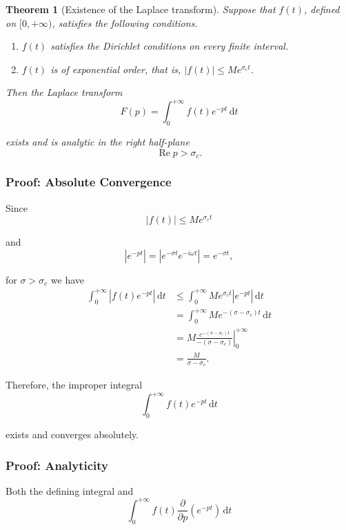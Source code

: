 \documentclass[11pt,a4paper]{article}
\theoremstyle{definition}
\theoremstyle{plain}
\newtheorem{theorem}{Theorem}
\begin{document}
\begin{theorem}[Existence of the Laplace transform]

Suppose that \(f(t)\), defined on \([0,+\infty)\), satisfies the
following conditions.

\begin{enumerate}
\def\labelenumi{\arabic{enumi}.}
\item
  \(f(t)\) satisfies the Dirichlet conditions on every finite interval.

\item
  \(f(t)\) is of exponential order, that is,
  \(|f(t)|\le Me^{\sigma_ct}\).

\end{enumerate}

Then the Laplace transform
\[
F(p)=\int_0^{+\infty}f(t)e^{-pt}\,\mathrm dt
\]

exists and is analytic in the right half-plane
\[
\operatorname{Re}p>\sigma_c.
\]
\end{theorem}

\subsubsection*{Proof: Absolute Convergence}

Since
\[
|f(t)|\le Me^{\sigma_ct}
\]

and
\[
|e^{-pt}|
=|e^{-\sigma t}e^{-i\omega t}|
=e^{-\sigma t},
\]

for \(\sigma>\sigma_c\) we have
\[
\begin{aligned}
\int_0^{+\infty}|f(t)e^{-pt}|\,\mathrm dt
&\le\int_0^{+\infty}Me^{\sigma_ct}|e^{-pt}|\,\mathrm dt\\
&=\int_0^{+\infty}Me^{-(\sigma-\sigma_c)t}\,\mathrm dt\\
&=\left.
M\frac{e^{-(\sigma-\sigma_c)t}}{-(\sigma-\sigma_c)}
\right|_0^{+\infty}\\
&=\frac{M}{\sigma-\sigma_c}.
\end{aligned}
\]

Therefore, the improper integral
\[
\int_0^{+\infty}f(t)e^{-pt}\,\mathrm dt
\]

exists and converges absolutely.

\subsubsection*{Proof: Analyticity}

Both the defining integral and
\[
\int_0^{+\infty}
f(t)\frac{\partial}{\partial p}(e^{-pt})\,\mathrm dt
\]
\end{document}

